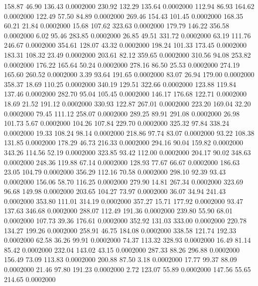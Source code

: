  158.87   46.90  136.43   0.0002000
 230.92  132.29  135.64   0.0002000
 112.94   86.93  164.62   0.0002000
 122.49   57.50   84.89   0.0002000
 269.46  154.43  101.45   0.0002000
 168.35   60.21   21.84   0.0002000
  15.68  107.62  323.63   0.0002000
 179.79  146.22  356.58   0.0002000
   6.02   95.46  283.85   0.0002000
  26.85   49.51  331.72   0.0002000
  63.19  111.76  246.67   0.0002000
 354.61  128.07   43.32   0.0002000
 198.24  101.33  173.45   0.0002000
 183.31  108.32   23.49   0.0002000
 203.61   82.12  359.65   0.0002000
 310.56   94.08  253.82   0.0002000
 176.22  165.64   50.24   0.0002000
 278.16   86.50   25.53   0.0002000
 274.19  165.60  260.52   0.0002000
   3.39   93.64  191.65   0.0002000
  83.07   26.94  179.00   0.0002000
 358.37   18.69  110.25   0.0002000
 340.19  129.51  322.66   0.0002000
 123.88  119.84  137.46   0.0002000
 282.70   95.04  105.45   0.0002000
 146.17  176.68  122.71   0.0002000
  18.69   21.52  191.12   0.0002000
 330.93  122.87  267.01   0.0002000
 223.20  169.04   32.20   0.0002000
  79.45  111.12  258.07   0.0002000
 289.25   89.91  291.08   0.0002000
  26.98  101.73    5.67   0.0002000
 104.26  107.84  229.70   0.0002000
 325.32   97.84  338.24   0.0002000
  19.33  108.24   98.14   0.0002000
 218.86   97.74   83.07   0.0002000
  93.22  108.38  131.85   0.0002000
 178.29   46.73  216.33   0.0002000
 294.16   90.04  159.82   0.0002000
 343.26  114.56   52.19   0.0002000
 323.85   93.42  112.00   0.0002000
 204.17   90.02  348.63   0.0002000
 248.36  119.88   67.14   0.0002000
 128.93   77.67   66.67   0.0002000
 186.63   23.05  104.79   0.0002000
 356.29  112.16   70.58   0.0002000
 298.10   92.39   93.43   0.0002000
 156.06   58.70  116.25   0.0002000
 279.90   14.81  267.34   0.0002000
 323.69   96.68  149.98   0.0002000
 203.65  104.27   73.97   0.0002000
  36.07   34.94  241.43   0.0002000
 353.80  111.01  314.19   0.0002000
 357.27   15.71  177.92   0.0002000
  93.47  137.63  346.68   0.0002000
 288.07  112.49  191.36   0.0002000
 239.80   55.90   68.01   0.0002000
 107.73   39.36  176.61   0.0002000
 352.92  131.03  333.00   0.0002000
 220.78  134.27  199.26   0.0002000
 258.91   46.75  184.08   0.0002000
 338.58  121.74  192.33   0.0002000
  62.58   36.26   99.91   0.0002000
  74.37  113.32  328.93   0.0002000
  16.49   81.14   85.42   0.0002000
 232.04  143.02   43.15   0.0002000
 287.33   88.26  296.88   0.0002000
 156.49   73.09  113.83   0.0002000
 200.88   87.50    3.18   0.0002000
  17.77   99.37   88.09   0.0002000
  21.46   97.80  191.23   0.0002000
   2.72  123.07   55.89   0.0002000
 147.56   55.65  214.65   0.0002000
